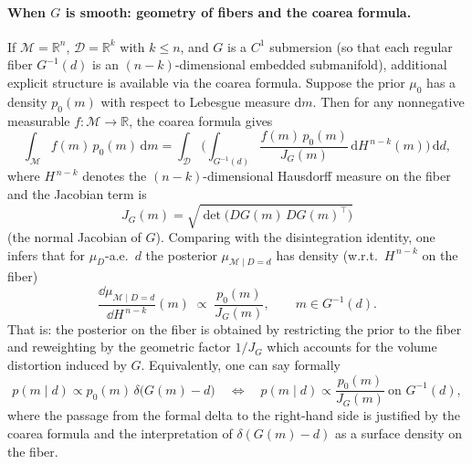 \documentclass[11pt]{article}
\theoremstyle{remark}
\newcommand{\modelspace}{\mathcal{M}}
\newcommand{\dataspace}{\mathcal{D}}
\begin{document}
\paragraph{When \(G\) is smooth: geometry of fibers and the coarea formula.}
If \(\modelspace=\mathbb{R}^{n}\), \(\dataspace=\mathbb{R}^{k}\) with \(k\le n\),
and \(G\) is a \(C^1\) submersion (so that each regular fiber \(G^{-1}(d)\) is an
\((n-k)\)-dimensional embedded submanifold), additional explicit structure is
available via the coarea formula. Suppose the prior \(\mu_0\) has a density
\(p_0(m)\) with respect to Lebesgue measure \(\mathrm{d}m\). Then for any
nonnegative measurable \(f:\modelspace\to\mathbb{R}\),
the coarea formula gives
\[
\int_{\modelspace} f(m)\,p_0(m)\,\mathrm{d}m
=
\int_{\dataspace}\!\biggl(\int_{G^{-1}(d)}
\frac{f(m)\,p_0(m)}{J_G(m)}\,\mathrm{d}H^{\,n-k}(m)\biggr)\,\mathrm{d}d,
\]
where \(H^{\,n-k}\) denotes the \((n-k)\)-dimensional Hausdorff measure on the
fiber and the Jacobian term is
\[
J_G(m) = \sqrt{\det\bigl(DG(m)\,DG(m)^\top\bigr)}
\]
(the normal Jacobian of \(G\)). Comparing with the disintegration identity, one
infers that for \(\mu_D\)-a.e.\ \(d\) the posterior \(\mu_{\modelspace\mid D=d}\)
has density (w.r.t.\ \(H^{\,n-k}\) on the fiber)
\begin{equation}\label{eq:posterior-fiber-density}
\frac{\dd\mu_{\modelspace\mid D=d}}{\dd H^{\,n-k}}(m)
\;\propto\;
\frac{p_0(m)}{J_G(m)},\qquad m\in G^{-1}(d).
\end{equation}
That is: the posterior on the fiber is obtained by restricting the prior to the
fiber and reweighting by the geometric factor \(1/J_G\) which accounts for the
volume distortion induced by \(G\). Equivalently, one can say formally
\[
p(m\mid d)\propto p_0(m)\,\delta\bigl(G(m)-d\bigr)
\quad\Longleftrightarrow\quad
p(m\mid d)\propto \frac{p_0(m)}{J_G(m)}\ \text{on }G^{-1}(d),
\]
where the passage from the formal delta to the right-hand side is justified by
the coarea formula and the interpretation of \(\delta(G(m)-d)\) as a surface
density on the fiber.
\end{document}
